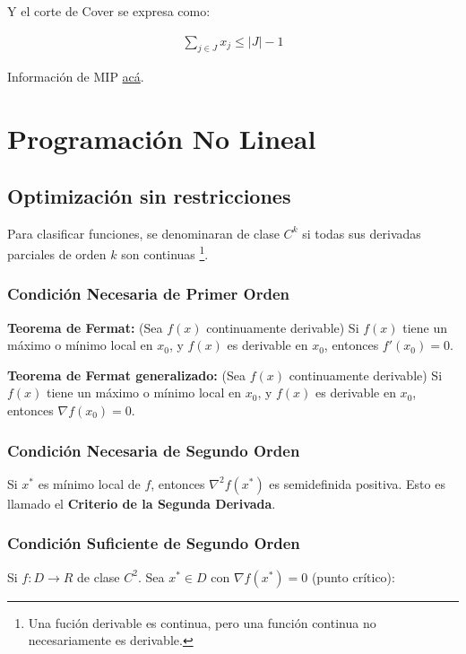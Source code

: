 \documentclass{article}
\begin{document}
Y el corte de Cover se expresa como:

\begin{align*}
    \sum_{j \in J} x_j \leq |J| - 1
\end{align*}

Información de MIP \href{https://optimization.cbe.cornell.edu/index.php?title=Mixed-integer_cuts}{acá}.

\section{Programaci\'on No Lineal}

\subsection{Optimizaci\'on sin restricciones}

Para clasificar funciones, se denominaran de clase $C^k$ si todas sus derivadas parciales de orden $k$ son continuas \footnote{Una fución derivable es continua, pero una función continua no necesariamente es derivable.}.

\subsubsection{Condición Necesaria de Primer Orden}

\textbf{Teorema de Fermat:} (Sea $f(x)$ continuamente derivable) Si $f(x)$ tiene un máximo o mínimo local en $x_0$, y $f(x)$ es derivable en $x_0$, entonces $f'(x_0) = 0$.

\textbf{Teorema de Fermat generalizado:} (Sea $f(x)$ continuamente derivable) Si $f(x)$ tiene un máximo o mínimo local en $x_0$, y $f(x)$ es derivable en $x_0$, entonces $\nabla f(x_0) = 0$.

\subsubsection{Condición Necesaria de Segundo Orden}

Si $x^*$ es mínimo local de $f$, entonces $\nabla^2f(x^*)$ es semidefinida positiva. Esto es llamado el \textbf{Criterio de la Segunda Derivada}.

\subsubsection{Condición Suficiente de Segundo Orden}

Si $f:D\to R$ de clase $C^2$. Sea $x^* \in D$ con $\nabla f(x^*)=0$ (punto crítico):
\end{document}

